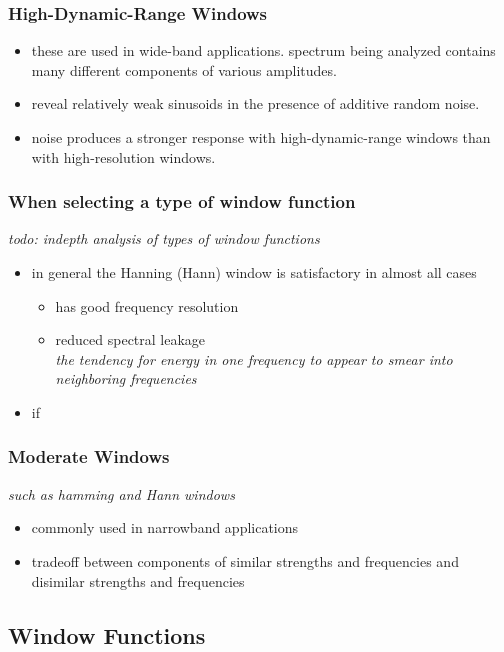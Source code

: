 \documentclass{article}
\begin{document}
\subsubsection*{High-Dynamic-Range Windows}
\begin{itemize}
	\item these are used in wide-band applications. spectrum being analyzed contains many different components of various amplitudes.
	\item reveal relatively weak sinusoids in the presence of additive random noise.
	\item noise produces a stronger response with high-dynamic-range windows than with high-resolution windows.
\end{itemize}

\subsubsection*{When selecting a type of window function}
\textit{todo: indepth analysis of types of window functions}
\begin{itemize}
	\item in general the Hanning (Hann) window is satisfactory in almost all cases
	\begin{itemize}
		\item has good frequency resolution
		\item reduced spectral leakage \\
			\textit{the tendency for energy in one frequency to appear to smear into neighboring frequencies}
	\end{itemize}
	\item if 
\end{itemize}

\subsubsection*{Moderate Windows}
\textit{such as hamming and Hann windows}
\begin{itemize}
	\item commonly used in narrowband applications
	\item tradeoff between components of similar strengths and frequencies and disimilar strengths and frequencies
\end{itemize}

\subsection*{Window Functions}
\end{document}
